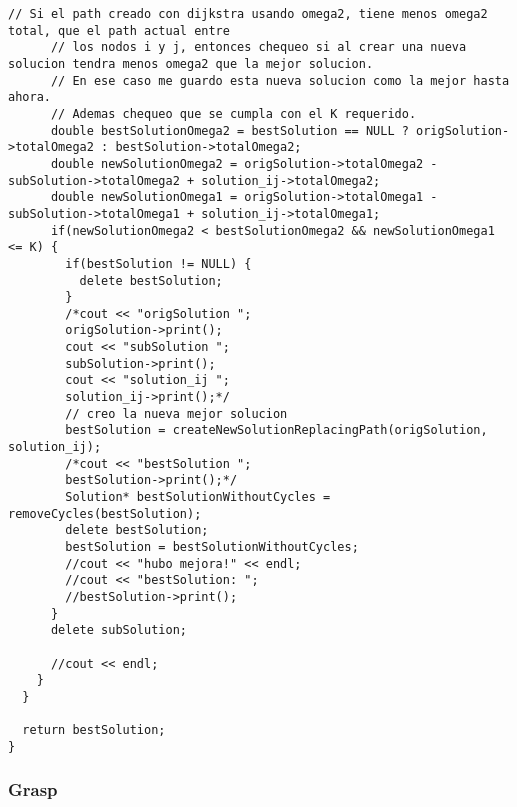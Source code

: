 \begin{lstlisting}[caption=NeighbourhoodSelectorA::getBestNeighbour()]
      // Si el path creado con dijkstra usando omega2, tiene menos omega2 total, que el path actual entre
      // los nodos i y j, entonces chequeo si al crear una nueva solucion tendra menos omega2 que la mejor solucion.
      // En ese caso me guardo esta nueva solucion como la mejor hasta ahora.
      // Ademas chequeo que se cumpla con el K requerido.                          
      double bestSolutionOmega2 = bestSolution == NULL ? origSolution->totalOmega2 : bestSolution->totalOmega2;
      double newSolutionOmega2 = origSolution->totalOmega2 - subSolution->totalOmega2 + solution_ij->totalOmega2;
      double newSolutionOmega1 = origSolution->totalOmega1 - subSolution->totalOmega1 + solution_ij->totalOmega1;            
      if(newSolutionOmega2 < bestSolutionOmega2 && newSolutionOmega1 <= K) {                     
        if(bestSolution != NULL) {
          delete bestSolution;   
        }       
        /*cout << "origSolution ";
        origSolution->print();
        cout << "subSolution ";
        subSolution->print();
        cout << "solution_ij ";
        solution_ij->print();*/
        // creo la nueva mejor solucion        
        bestSolution = createNewSolutionReplacingPath(origSolution, solution_ij);           
        /*cout << "bestSolution ";
        bestSolution->print();*/
        Solution* bestSolutionWithoutCycles = removeCycles(bestSolution);                         
        delete bestSolution;
        bestSolution = bestSolutionWithoutCycles;        
        //cout << "hubo mejora!" << endl;
        //cout << "bestSolution: ";
        //bestSolution->print();
      }      
      delete subSolution;

      //cout << endl;      
    }
  }
    
  return bestSolution;  
}
\end{lstlisting}
\subsubsection{Grasp}


